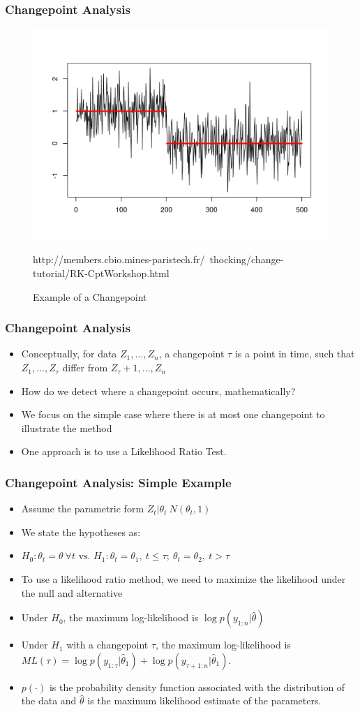 \documentclass{beamer}
\begin{document}
\begin{frame}
	\frametitle{Changepoint Analysis}
	\begin{figure}
		\centering
		\includegraphics[width=0.75\linewidth]{../img/changepointex.png}
		\caption{Example of a Changepoint}
		
		http://members.cbio.mines-paristech.fr/~thocking/change-tutorial/RK-CptWorkshop.html
	\end{figure}
\end{frame}

\begin{frame}
	\frametitle{Changepoint Analysis}
	\begin{itemize}
		\item Conceptually, for data $Z_1,...,Z_n$, a changepoint $\tau$ is a point in time, such that $Z_1,...,Z_\tau$ differ from  $Z_\tau+1,...,Z_n$
		\item How do we detect where a changepoint occurs, mathematically?
		\item We focus on the simple case where there is at most one changepoint to illustrate the method
		\item One approach is to use a Likelihood Ratio Test.
	\end{itemize}
\end{frame}

\begin{frame}
	\frametitle{Changepoint Analysis: Simple Example}
	\begin{itemize}
		\item Assume the parametric form $Z_t|\theta_t~N(\theta_t,1)$
		\item We state the hypotheses as: 		\item $H_0:\theta_t=\theta~ \forall t \text{ vs. } H_1:\theta_t=\theta_1,~t\leq\tau;~ \theta_t=\theta_2,~t>\tau   $
		\item To use a likelihood ratio method, we need to maximize the likelihood under the null and alternative
		\item Under $H_0$, the maximum log-likelihood is $\log p(y_{1:n}|\hat{\theta})$
		\item Under $H_1$ with a changepoint $\tau$, the maximum log-likelihood is $ML(\tau) = \log p(y_{1:\tau}|\hat{\theta}_1) +  \log p(y_{\tau+1:n}|\hat{\theta}_1)$. 
		\item  $p(\cdot)$ is the probability density function associated with the distribution of the data and $\hat{\theta}$ is
		the maximum likelihood estimate of the parameters.
	\end{itemize}
\end{frame}
\end{document}
